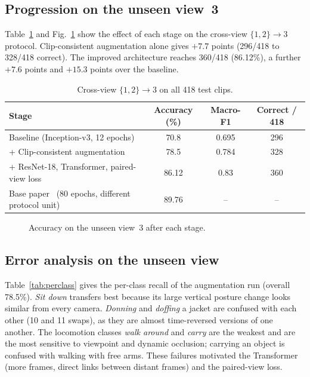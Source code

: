 \documentclass[runningheads]{llncs}
\begin{document}
\subsection{Progression on the unseen view~3}
Table~\ref{tab:progress} and Fig.~\ref{fig:progress} show the effect of each stage on the cross-view $\{1,2\}\rightarrow3$ protocol.
Clip-consistent augmentation alone gives $+7.7$ points (296/418 to 328/418 correct). The improved architecture reaches 360/418 (86.12\%), a further $+7.6$ points and $+15.3$ points over the baseline.

\begin{table}[t]
\caption{Cross-view $\{1,2\}\rightarrow3$ on all 418 test clips.}\label{tab:progress}
\centering
\small
\begin{tabular}{lccc}
\toprule
Stage & Accuracy (\%) & Macro-F1 & Correct / 418 \\
\midrule
Baseline (Inception-v3, 12 epochs) & 70.8 & 0.695 & 296 \\
+ Clip-consistent augmentation & 78.5 & 0.784 & 328 \\
+ ResNet-18, Transformer, paired-view loss & 86.12 & 0.83 & 360 \\
\midrule
Base paper~\cite{bui2020} (80 epochs, different protocol unit) & 89.76 & -- & -- \\
\bottomrule
\end{tabular}
\end{table}

\begin{figure}[t]
\centering
{}
\caption{Accuracy on the unseen view~3 after each stage.}\label{fig:progress}
\end{figure}

\subsection{Error analysis on the unseen view}
Table~\ref{tab:perclass} gives the per-class recall of the augmentation run (overall 78.5\%). \emph{Sit down} transfers best because its large vertical posture change looks similar from every camera. \emph{Donning} and \emph{doffing} a jacket are confused with each other (10 and 11 swaps), as they are almost time-reversed versions of one another. The locomotion classes \emph{walk around} and \emph{carry} are the weakest and are the most sensitive to viewpoint and dynamic occlusion; carrying an object is confused with walking with free arms. These failures motivated the Transformer (more frames, direct links between distant frames) and the paired-view loss.
\end{document}
